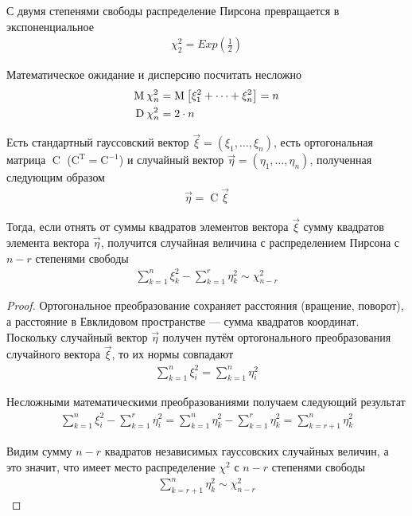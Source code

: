 С двумя степенями свободы распределение Пирсона превращается в экспоненциальное
\begin{align*}
  \chi_2^2 = Exp\left( \frac{1}{2} \right)
\end{align*}

Математическое ожидание и дисперсию посчитать несложно
\begin{align*}
  \operatorname{M}_{} \chi_n^2 &= \operatorname{M}_{} \left[ \xi_1^2 + \dots + \xi_n^2 \right] = n \\
  \operatorname{D}_{} \chi_n^2 &= 2 \cdot n
\end{align*}

\begin{lemma}[Фишера]
  Есть стандартный гауссовский вектор
  $\vec{\xi} = \left( \xi_1, \dots, \xi_n \right)$, есть ортогональная матрица
  $\operatorname{C}$ ($\operatorname{C^T} = \operatorname{C^{-1}}$) и
  случайный вектор $\vec{\eta} = \left( \eta_1, \dots, \eta_n \right)$,
  полученная следующим образом
  \begin{align*}
      \vec{\eta} = \operatorname{C} \vec{\xi}
  \end{align*}

  Тогда, если отнять от суммы квадратов элементов вектора $\vec{\xi}$ сумму
  квадратов элемента вектора $\vec{\eta}$, получится случайная величина
  с распределением Пирсона с $n-r$ степенями свободы
  \begin{align*}
      \sum_{k=1}^{n} \xi_k^2 - \sum_{k=1}^{r} \eta_k^2 \sim \chi_{n-r}^2
  \end{align*}
\end{lemma}
\begin{proof}
  Ортогональное преобразование сохраняет расстояния (вращение, поворот), а
  расстояние в Евклидовом пространстве --- сумма квадратов координат.
  Поскольку случайный вектор $\vec{\eta}$ получен путём ортогонального
  преобразования случайного вектора $\vec{\xi}$, то их нормы совпадают
  \begin{align*}
      \sum_{k=1}^{n}\xi_i^2 = \sum_{k=1}^{n}\eta_i^2
  \end{align*}

  Несложными математическими преобразованиями получаем следующий результат
  \begin{align*}
      \sum_{k=1}^{n} \xi_i^2 - \sum_{k=1}^{r} \eta_i^2
      = \sum_{k=1}^{n} \eta_k^2 - \sum_{k=1}^{r} \eta_k^2
      = \sum_{k=r+1}^{n} \eta_k^2
  \end{align*}

  Видим сумму $n-r$ квадратов независимых гауссовских случайных величин,
  а это значит, что имеет место распределение $\chi^2$ с $n-r$ степенями
  свободы
  \begin{align*}
      \sum_{k=r+1}^{n} \eta_k^2 \sim \chi_{n-r}^2
  \end{align*}
\end{proof}

